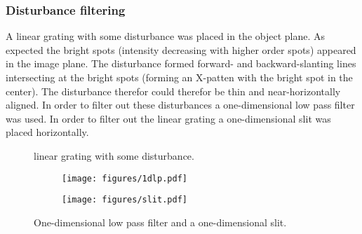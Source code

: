 \documentclass[12pt,a4paper]{article}
\begin{document}
\subsubsection{Disturbance filtering}
A linear grating with some disturbance was placed in the object plane. As expected the bright spots (intensity decreasing with higher order spots) appeared in the image plane. The disturbance formed forward- and backward-slanting lines intersecting at the bright spots (forming an X-patten with the bright spot in the center). The disturbance  therefor could therefor be thin and near-horizontally aligned.
In order to filter out these disturbances a one-dimensional low pass filter was used.
In order to filter out the linear grating a one-dimensional slit was placed horizontally.
\begin{figure}
  \centering
  \noindent\makebox[\textwidth]{\scalebox{0.70}{}}
  \caption{linear grating with some disturbance.}
  \label{fig:disturbance}
\end{figure}
\begin{figure}
  \centering
  \begin{subfigure}[b]{0.45\textwidth}
    \texttt{[image: figures/1dlp.pdf]}
  \end{subfigure}
  \begin{subfigure}[b]{0.45\textwidth}
    \texttt{[image: figures/slit.pdf]}
  \end{subfigure}
  \caption{One-dimensional low pass filter and a one-dimensional slit.}
  \label{fig:filters}
\end{figure}
\end{document}
